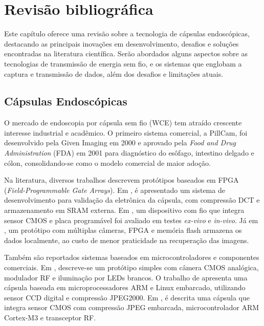 \documentclass[repeatfields,xlists,xpacks,oneside]{ufrgscca}
\begin{document}
\chapter{Revisão bibliográfica}
Este capítulo oferece uma revisão sobre a tecnologia de cápsulas endoscópicas, destacando as principais inovações em desenvolvimento, desafios e soluções encontradas na literatura científica. Serão abordados alguns aspectos sobre as tecnologias de transmissão de energia sem fio, e os sistemas que englobam a captura e transmissão de dados, além dos desafios e limitações atuais.

\section{Cápsulas Endoscópicas}


O mercado de endoscopia por cápsula sem fio (WCE) tem atraído crescente interesse industrial e acadêmico. O primeiro sistema comercial, a PillCam, foi desenvolvido pela Given Imaging em 2000 \cite{Pillcam} e aprovado pela \textit{Food and Drug Administration} (FDA) em 2001 para diagnóstico do esôfago, intestino delgado e cólon, consolidando-se como o modelo comercial de maior adoção.

Na literatura, diversos trabalhos descrevem protótipos baseados em FPGA (\textit{Field-Programmable Gate Arrays}). Em \textcite{cavallotti2011fpga}, é apresentado um sistema de desenvolvimento para validação da eletrônica da cápsula, com compressão DCT e armazenamento em SRAM externa. Em \textcite{covi2010miniaturized}, um dispositivo com fio que integra sensor CMOS e placa programável foi avaliado em testes \textit{ex-vivo} e \textit{in-vivo}. Já em \textcite{meng2021novel}, um protótipo com múltiplas câmeras, FPGA e memória flash armazena os dados localmente, ao custo de menor praticidade na recuperação das imagens.

Também são reportados sistemas baseados em microcontroladores e componentes comerciais. Em \textcite{gao2022stable}, descreve-se um protótipo simples com câmera CMOS analógica, modulador RF e iluminação por LEDs brancos. O trabalho de \textcite{khan2020computer} apresenta uma cápsula baseada em microprocessadores ARM e Linux embarcado, utilizando sensor CCD digital e compressão JPEG2000. Em \textcite{cheng2010novel}, é descrita uma cápsula que integra sensor CMOS com compressão JPEG embarcada, microcontrolador ARM Cortex-M3 e transceptor RF.
\end{document}
